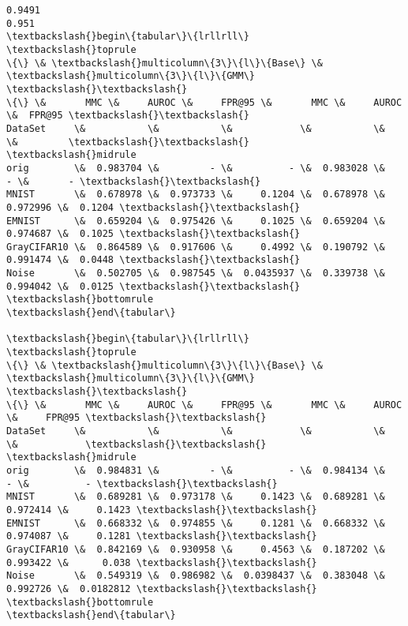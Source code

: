\documentclass[11pt]{article}
\begin{document}
    \begin{Verbatim}[commandchars=\\\{\}]
0.9491
0.951
\textbackslash{}begin\{tabular\}\{lrllrll\}
\textbackslash{}toprule
\{\} \& \textbackslash{}multicolumn\{3\}\{l\}\{Base\} \& \textbackslash{}multicolumn\{3\}\{l\}\{GMM\} \textbackslash{}\textbackslash{}
\{\} \&       MMC \&     AUROC \&     FPR@95 \&       MMC \&     AUROC \&  FPR@95 \textbackslash{}\textbackslash{}
DataSet     \&           \&           \&            \&           \&           \&         \textbackslash{}\textbackslash{}
\textbackslash{}midrule
orig        \&  0.983704 \&         - \&          - \&  0.983028 \&         - \&       - \textbackslash{}\textbackslash{}
MNIST       \&  0.678978 \&  0.973733 \&     0.1204 \&  0.678978 \&  0.972996 \&  0.1204 \textbackslash{}\textbackslash{}
EMNIST      \&  0.659204 \&  0.975426 \&     0.1025 \&  0.659204 \&  0.974687 \&  0.1025 \textbackslash{}\textbackslash{}
GrayCIFAR10 \&  0.864589 \&  0.917606 \&     0.4992 \&  0.190792 \&  0.991474 \&  0.0448 \textbackslash{}\textbackslash{}
Noise       \&  0.502705 \&  0.987545 \&  0.0435937 \&  0.339738 \&  0.994042 \&  0.0125 \textbackslash{}\textbackslash{}
\textbackslash{}bottomrule
\textbackslash{}end\{tabular\}

\textbackslash{}begin\{tabular\}\{lrllrll\}
\textbackslash{}toprule
\{\} \& \textbackslash{}multicolumn\{3\}\{l\}\{Base\} \& \textbackslash{}multicolumn\{3\}\{l\}\{GMM\} \textbackslash{}\textbackslash{}
\{\} \&       MMC \&     AUROC \&     FPR@95 \&       MMC \&     AUROC \&     FPR@95 \textbackslash{}\textbackslash{}
DataSet     \&           \&           \&            \&           \&           \&            \textbackslash{}\textbackslash{}
\textbackslash{}midrule
orig        \&  0.984831 \&         - \&          - \&  0.984134 \&         - \&          - \textbackslash{}\textbackslash{}
MNIST       \&  0.689281 \&  0.973178 \&     0.1423 \&  0.689281 \&  0.972414 \&     0.1423 \textbackslash{}\textbackslash{}
EMNIST      \&  0.668332 \&  0.974855 \&     0.1281 \&  0.668332 \&  0.974087 \&     0.1281 \textbackslash{}\textbackslash{}
GrayCIFAR10 \&  0.842169 \&  0.930958 \&     0.4563 \&  0.187202 \&  0.993422 \&      0.038 \textbackslash{}\textbackslash{}
Noise       \&  0.549319 \&  0.986982 \&  0.0398437 \&  0.383048 \&  0.992726 \&  0.0182812 \textbackslash{}\textbackslash{}
\textbackslash{}bottomrule
\textbackslash{}end\{tabular\}


    \end{Verbatim}
\end{document}
